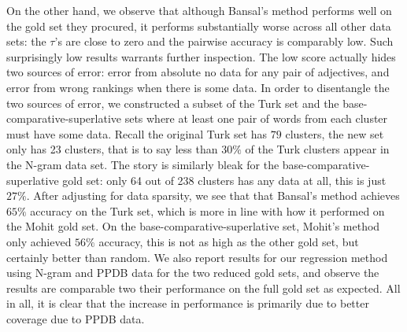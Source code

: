 On the other hand, we observe that although Bansal's method performs well on the gold set they procured, it performs substantially worse across all other data sets: the $\tau$'s are close to zero and the pairwise accuracy is comparably low. Such surprisingly low results warrants further inspection. The low score actually hides two sources of error: error from absolute no data for any pair of adjectives, and error from wrong rankings when there is some data. In order to disentangle the two sources of error, we constructed a subset of the Turk set and the base-comparative-superlative sets where at least one pair of words from each cluster must have some data. Recall the original Turk set has $79$ clusters, the new set only has 23 clusters, that is to say less than $30\%$ of the Turk clusters appear in the N-gram data set. The story is similarly bleak for the base-comparative-superlative gold set: only 64 out of 238 clusters has any data at all, this is just $27\%$. After adjusting for data sparsity, we see that that Bansal's method achieves $65\%$ accuracy on the Turk set, which is more in line with how it performed on the Mohit gold set. On the base-comparative-superlative set, Mohit's method only achieved $56\%$ accuracy, this is not as high as the other gold set, but certainly better than random. We also report results for our regression method using N-gram and PPDB data for the two reduced gold sets, and observe the results are comparable two their performance on the full gold set as expected. All in all, it is clear that the increase in performance is primarily due to better coverage due to PPDB data. 

